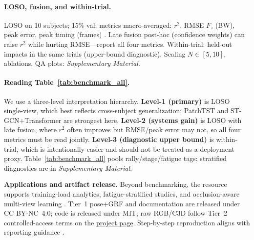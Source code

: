 \documentclass[sigconf,screen]{acmart}
\newcommand{\BadmintonGRFGitHubBase}{https://github.com/KenyaNiu/BadmintonGRF}
\newcommand{\BadmintonGRFRepoShort}{\href{\BadmintonGRFGitHubBase}{project page}}
\newcommand{\BadmintonGRFSupplementary}{\emph{Supplementary Material}}
\newcommand{\QAabbrev}{QA}
\begin{document}
\paragraph{LOSO, fusion, and within-trial.}
LOSO on 10 subjects; 15\% val; metrics macro-averaged: \(r^2\), RMSE \(F_z\) (BW), peak error, peak timing (frames) \cite{ishida2024Estimation,mundt2022Estimating}. Late fusion post-hoc (confidence weights) can raise \(r^2\) while hurting RMSE---report all four metrics. Within-trial: held-out impacts in the same trials (upper-bound diagnostic). Scaling $N\!\in\![5,10]$, ablations, \QAabbrev{} plots: \BadmintonGRFSupplementary.

\paragraph{Reading Table~\ref{tab:benchmark_all}.}
We use a three-level interpretation hierarchy. \textbf{Level-1 (primary)} is LOSO single-view, which best reflects cross-subject generalization; PatchTST and ST-GCN+Transformer are strongest here. \textbf{Level-2 (systems gain)} is LOSO with late fusion, where \(r^2\) often improves but RMSE/peak error may not, so all four metrics must be read jointly. \textbf{Level-3 (diagnostic upper bound)} is within-trial, which is intentionally easier and should not be treated as a deployment proxy. Table~\ref{tab:benchmark_all} pools rally/stage/fatigue tags; stratified diagnostics are in \BadmintonGRFSupplementary.

\noindent\textbf{Applications and artifact release.}
Beyond benchmarking, the resource supports training-load analytics, fatigue-stratified studies, and occlusion-aware multi-view learning \cite{johnsonOnfieldPlayerWorkload2019,gaoAutomatedRecognitionAsymmetric2023,mundt2022Estimating,bogaertPredictingVerticalGround2024}. Tier~1 pose+GRF and documentation are released under CC BY-NC~4.0; code is released under MIT; raw RGB/C3D follow Tier~2 controlled-access terms on the \BadmintonGRFRepoShort. Step-by-step reproduction aligns with reporting guidance \cite{hebert-losierReportingGuidelinesRunning2023}.
\end{document}
